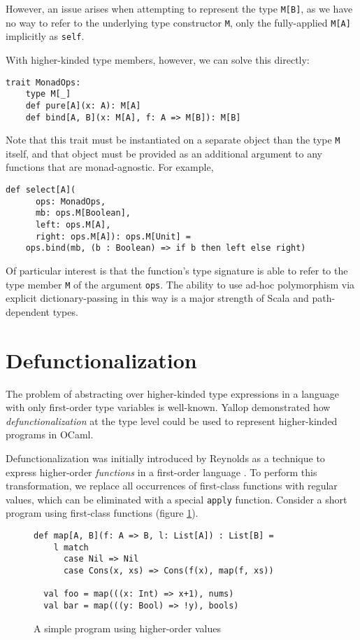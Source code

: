 \documentclass[acmsmall,screen]{acmart}
\begin{document}
However, an issue arises when attempting to represent the type \texttt{M[B]},
as we have no way to refer to the underlying type constructor \texttt{M}, only
the fully-applied \texttt{M[A]} implicitly as \texttt{self}.

With higher-kinded type members, however, we can solve this directly:
\begin{lstlisting}[style=scala]
  trait MonadOps:
    type M[_]
    def pure[A](x: A): M[A]
    def bind[A, B](x: M[A], f: A => M[B]): M[B]
\end{lstlisting}

Note that this trait must be instantiated on a separate object than the type
\texttt{M} itself, and that object must be provided as an additional argument
to any functions that are monad-agnostic. For example,
\begin{lstlisting}[style=scala]
  def select[A](
      ops: MonadOps,
      mb: ops.M[Boolean],
      left: ops.M[A],
      right: ops.M[A]): ops.M[Unit] =
    ops.bind(mb, (b : Boolean) => if b then left else right)
\end{lstlisting}

Of particular interest is that the function's type signature is able to refer
to the type member \texttt{M} of the argument \texttt{ops}. The ability to use
ad-hoc polymorphism via explicit dictionary-passing in this way is a major
strength of Scala and path-dependent types.

\section{Defunctionalization}

The problem of abstracting over higher-kinded type expressions in a language
with only first-order type variables is well-known. Yallop
\cite{Yallop_White_2014} demonstrated how \emph{defunctionalization} at the
type level could be used to represent higher-kinded programs in OCaml.

Defunctionalization was initially introduced by Reynolds as a technique to
express higher-order \emph{functions} in a first-order language
\cite{Reynolds1972}. To perform this transformation, we replace all occurrences
of first-class functions with regular values, which can be eliminated with a
special \texttt{apply} function. Consider a short program using first-class
functions (figure \ref{fig::defun-pre}).

\begin{figure}
  \begin{lstlisting}[style=scala]
  def map[A, B](f: A => B, l: List[A]) : List[B] =
    l match
      case Nil => Nil
      case Cons(x, xs) => Cons(f(x), map(f, xs))

  val foo = map(((x: Int) => x+1), nums)
  val bar = map(((y: Bool) => !y), bools)
  \end{lstlisting}
  \caption{A simple program using higher-order values}\label{fig::defun-pre}
\end{figure}
\end{document}
